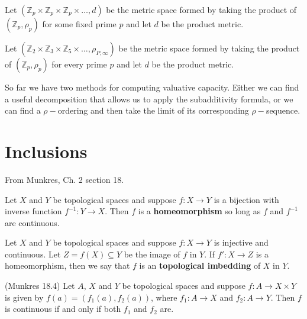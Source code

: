 \begin{example}
	Let $(\mathbb{Z}_p \times \mathbb{Z}_p \times \mathbb{Z}_p \times \ldots, d)$ be the metric space formed by taking the product of $(\mathbb{Z}_p, \rho_p)$ for some fixed prime $p$ and let $d$ be the product metric.
\end{example}

\begin{example}
	Let $(\mathbb{Z}_2 \times \mathbb{Z}_3 \times \mathbb{Z}_5 \times \ldots, \rho_{P,\infty})$ be the metric space formed by taking the product of $(\mathbb{Z}_p, \rho_p)$ for every prime $p$ and let $d$ be the product metric.
\end{example}

So far we have two methods for computing valuative capacity. Either we can find a useful decomposition that allows us to apply the subadditivity formula, or we can find a $\rho-$ordering and then take the limit of its corresponding $\rho-$sequence.

\section*{Inclusions}
From Munkres, Ch. 2 section 18.

\begin{definition*}
Let $X$ and $Y$ be topological spaces and suppose $f: X \rightarrow Y$ is a bijection with inverse function $f^{-1}: Y \rightarrow X$. Then $f$ is a \textbf{homeomorphism} so long as $f$ and $f^{-1}$ are continuous.
\end{definition*}

\begin{definition*}
Let $X$ and $Y$ be topological spaces and suppose $f: X \rightarrow Y$ is injective and continuous. Let $Z =f(X) \subseteq Y$ be the image of $f$ in $Y$. If $f': X \rightarrow Z$ is a homeomorphism, then we say that $f$ is an \textbf{topological imbedding} of $X$ in $Y$.
\end{definition*}

\begin{proposition*} (Munkres 18.4)
Let $A$, $X$ and $Y$ be topological spaces and suppose $f: A \rightarrow X \times Y$  is given by $f(a) = (f_1(a), f_2(a))$, where $f_1:A \rightarrow X$ and $f_2:A \rightarrow Y$. Then $f$ is continuous if and only if both $f_1$ and $f_2$ are.  
\end{proposition*}


